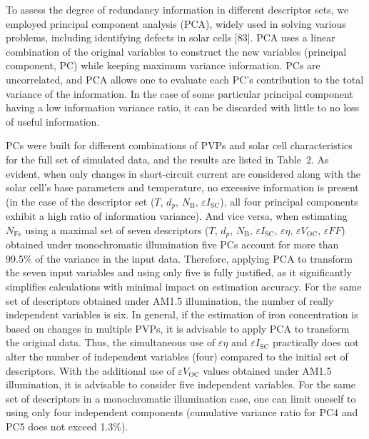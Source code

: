 \documentclass[a4paper,fleqn]{cas-sc}
\begin{document}
\begin{mdframed}
To assess the \textcolor[rgb]{1.00,0.07,0.00}{degree} of redundancy information
\textcolor[rgb]{1.00,0.07,0.00}{in different descriptor sets, we employed} principal component analysis (PCA),
widely used in solving various problems, including identifying defects in solar cells [83].
PCA uses a linear combination of the original variables to \textcolor[rgb]{1.00,0.07,0.00}{construct} the new variables (principal component, PC) while keeping maximum variance information.
PCs are \textcolor[rgb]{1.00,0.07,0.00}{uncorrelated, and PCA allows one to evaluate each PC’s contribution to the total variance of the information.}
In the case of some particular principal component having a low information variance ratio, it can be discarded with little to no loss of useful information.

PCs were built for different combinations of PVPs and solar cell characteristics
for the full set of simulated data, and the results are listed in Table~2.
As evident, when only changes in short-circuit current are considered along with the solar cell's base parameters and temperature,
no excessive information is present \textcolor[rgb]{1.00,0.07,0.00}{(in the case of the descriptor set ($T$, $d_p$, $N_\mathrm{B}$, $\varepsilon I_\mathrm{SC}$),
all four principal components exhibit a high ratio of information variance)}.
\textcolor[rgb]{1.00,0.07,0.00}{And vice versa, when estimating $N_\mathrm{Fe}$ using a maximal set of
seven descriptors ($T$, $d_p$, $N_\mathrm{B}$, $\varepsilon I_\mathrm{SC}$, $\varepsilon \eta$, $\varepsilon V_\mathrm{OC}$, $\varepsilon F\!F$)
obtained under monochromatic illumination five PCs account for more than 99.5\% of the variance in the input data.
Therefore, applying PCA to transform the seven input variables and using only five is fully justified,
as it significantly simplifies calculations with minimal impact on estimation accuracy.
For the same set of descriptors obtained under AM1.5 illumination,
the number of really independent variables is six.
In general, if the estimation of iron concentration is based on changes in multiple PVPs,
it is advisable to apply PCA to transform the original data.
Thus, the simultaneous use of $\varepsilon \eta$ and $\varepsilon I_\mathrm{SC}$ practically does not alter
the number of independent variables (four) compared to the initial set of descriptors.}
With the additional use of $\varepsilon V_\mathrm{OC}$ values obtained under AM1.5 illumination, it is advisable to consider five independent variables.
For the same set of descriptors in a monochromatic illumination case, one can limit oneself to using only four independent components
(cumulative variance ratio for PC4 and PC5 does not exceed 1.3\%).
\end{mdframed}
\end{document}
